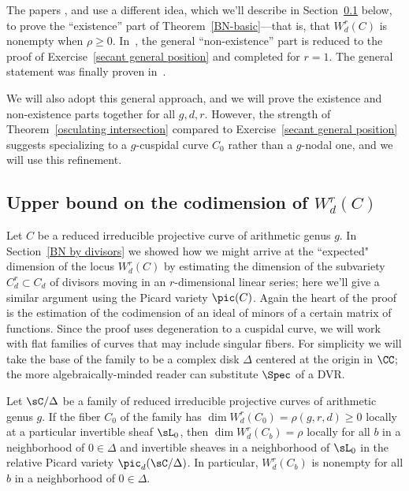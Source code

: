 The papers \cite{MR323792}, \cite{MR0357398} and \cite{Kempf} use a different  idea, which we'll describe in Section~\ref{upper bound} below,
to prove the ``existence'' part of Theorem~\ref{BN-basic}---that is, that $W^{r}_{d}(C)$ is nonempty when
$\rho\geq 0$. In~\cite{Kleiman-special},  the general ``non-existence'' part is reduced to the proof of Exercise~\ref{secant general position} and completed for $r=1$. The general statement was finally proven in~\cite{Griffiths-Harris-BN}.

We will also adopt this general approach, and we will prove the existence and non-existence parts together
for all $g,d,r$. However, the strength of Theorem~\ref{osculating intersection} compared to Exercise~\ref{secant general position} suggests specializing to a $g$-cuspidal curve $C_0$ rather than a $g$-nodal one, and we will use
this refinement. 

\subsection{Upper bound on the codimension of $W^r_d(C)$}\label{upper bound}

Let $C$ be a reduced irreducible projective curve of arithmetic genus $g$.  In Section~\ref{BN by divisors} we showed how we might arrive at the ``expected" dimension of the locus $W^r_d(C)$ by estimating the dimension of the subvariety $C^r_d \subset C_d$ of divisors moving in an $r$-dimensional linear series; here we'll give a similar argument using the Picard variety $\pic(C)$. Again the heart of the proof is the estimation of the
codimension of an ideal of minors of a certain matrix of functions. Since the proof uses degeneration
to a cuspidal curve, we will work with flat families of curves that may include singular fibers. For simplicity
we will take the base of the family to be a complex disk $\Delta$ centered at the origin in $\CC$; the more algebraically-minded reader can substitute $\Spec$ of a DVR.

\begin{theorem}\label{local existence}
Let $\sC/\Delta$ be a family of reduced irreducible projective curves of arithmetic genus $g$. If
the fiber  $C_0$ of the family has $\dim W^r_d(C_0) = \rho(g,r,d) \geq 0$
locally at a particular invertible sheaf $\sL_{0}$,  then $\dim W^r_d(C_b) = \rho$ locally for all $b$ in a neighborhood of $0 \in \Delta$ and invertible sheaves in a neighborhood of $\sL_{0}$
in the relative Picard variety $\pic_{d}(\sC/\Delta)$. In particular, $W^r_d(C_b)$ is nonempty for all $b$ in a neighborhood of $0 \in \Delta$.
\end{theorem}

